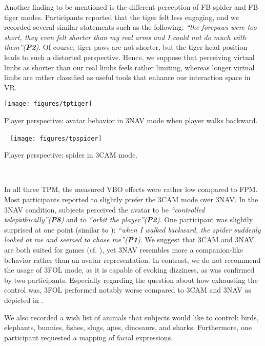 \documentclass{sigchi-ext}
\begin{document}
Another finding to be mentioned is the different perception of FB spider and FB tiger modes. Participants reported that the tiger felt less engaging, and we recorded several similar statements such as the following: \textit{``the forepaws were too short, they even felt shorter than my real arms and I could not do much with them''(\textbf{P2})}. Of course, tiger paws are not shorter, but the tiger head position leads to such a distorted perspective. Hence, we suppose that perceiving virtual limbs as shorter than our real limbs feels rather limiting, whereas longer virtual limbs are rather classified as useful tools that enhance our interaction space in VR.

\begin{marginfigure}[0pc]
  \begin{minipage}{\marginparwidth}
    \centering
    \texttt{[image: figures/tptiger]}
    \caption{Player perspective: avatar behavior in 3NAV mode when player walks backward.}~\label{fig:3NAV}
    \vspace{1pc}
        \centering
    \texttt{[image: figures/tpspider]}
    \caption{Player perspective: spider in 3CAM mode.}~\label{fig:3CAM}
  \end{minipage}
\end{marginfigure}

In all three TPM, the measured VBO effects were rather low compared to FPM. Most participants reported to slightly prefer the 3CAM mode over 3NAV. In the 3NAV condition, subjects perceived the avatar to be \textit{``controlled telepathically''(\textbf{P8})} and to \textit{``orbit the player''(\textbf{P2})}. One participant was slightly surprised at one point (similar to ): \textit{``when I walked backward, the spider suddenly looked at me and seemed to chase me''(\textbf{P1})}. We suggest that 3CAM and 3NAV are both suited for games (cf. ), yet 3NAV resembles more a companion-like behavior rather than an avatar representation. In contrast, we do not recommend the usage of 3FOL mode, as it is capable of evoking dizziness, as was confirmed by two participants. Especially regarding the question about how exhausting the control was, 3FOL performed notably worse compared to 3CAM and 3NAV as depicted in .



We also recorded a wish list of animals that subjects would like to control: birds, elephants, bunnies, fishes, slugs, apes, dinosaurs, and sharks. Furthermore, one participant requested a mapping of facial expressions.
\end{document}

